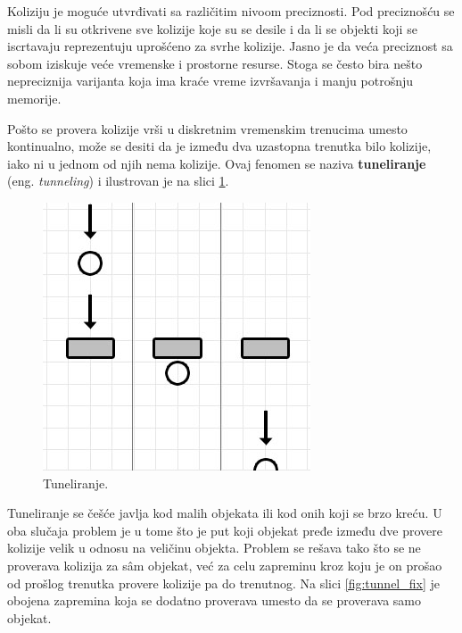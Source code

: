 \documentclass[12pt,oneside]{memoir}
\begin{document}
Koliziju je moguće utvrđivati sa različitim nivoom preciznosti. 
Pod preciznošću se misli da li su otkrivene sve kolizije koje su se desile i 
da li se objekti koji se iscrtavaju reprezentuju uprošćeno za svrhe kolizije. 
Jasno je da veća preciznost sa sobom iziskuje veće vremenske i prostorne resurse. 
Stoga se često bira nešto nepreciznija varijanta koja ima kraće vreme izvršavanja i manju potrošnju memorije.

Pošto se provera kolizije vrši u diskretnim vremenskim trenucima umesto kontinualno, može se desiti da 
je između dva uzastopna trenutka bilo kolizije, iako ni u jednom od njih nema kolizije. 
Ovaj fenomen se naziva \textbf{tuneliranje} (eng. {\em tunneling}) i ilustrovan je na slici \ref{fig:tunnel}. 

\begin{figure}[h!]
	\begin{center}
	\includegraphics[scale=0.55]{tunnel.png}
	\end{center}
	\caption{Tuneliranje.}
	\label{fig:tunnel}
\end{figure}

Tuneliranje se češće javlja kod malih objekata ili kod onih koji se brzo kreću.
U oba slučaja problem je u tome što je put koji objekat pređe između dve provere kolizije velik u odnosu na veličinu objekta. 
Problem se rešava tako što se ne proverava kolizija za sâm objekat, već za celu zapreminu kroz koju je on prošao 
od prošlog trenutka provere kolizije pa do trenutnog. Na slici \ref{fig:tunnel_fix} je obojena zapremina 
koja se dodatno proverava umesto da se proverava samo objekat. 
\end{document}
